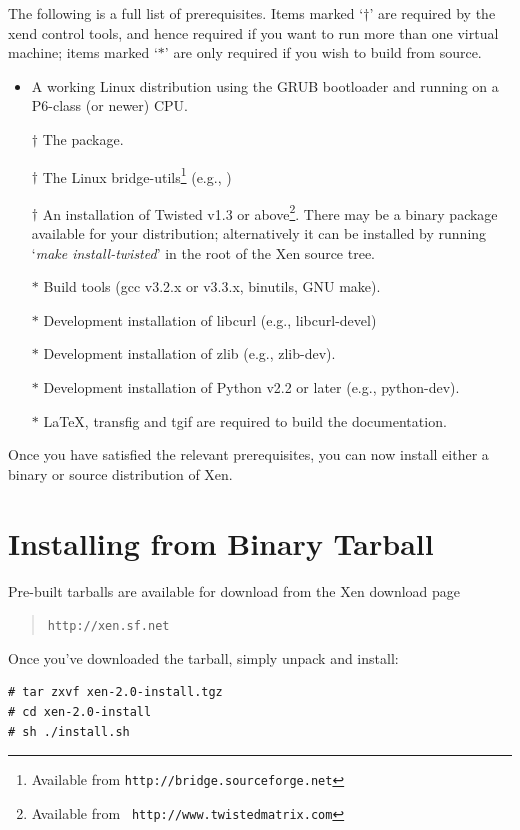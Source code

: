 \documentclass[11pt,twoside,final,openright]{report}
\def\xend{{xend}\xspace}
\begin{document}
The following is a full list of prerequisites.  Items marked `$\dag$'
are required by the \xend control tools, and hence required if you
want to run more than one virtual machine; items marked `$*$' are only
required if you wish to build from source.
\begin{itemize}
\item A working Linux distribution using the GRUB bootloader and
running on a P6-class (or newer) CPU.
\item [$\dag$] The  package. 
\item [$\dag$] The Linux bridge-utils\footnote{Available from 
{\tt http://bridge.sourceforge.net}} (e.g., )
\item [$\dag$] An installation of Twisted v1.3 or
above\footnote{Available from {\tt
http://www.twistedmatrix.com}}. There may be a binary package
available for your distribution; alternatively it can be installed by
running `{\sl make install-twisted}' in the root of the Xen source
tree.
\item [$*$] Build tools (gcc v3.2.x or v3.3.x, binutils, GNU make).
\item [$*$] Development installation of libcurl (e.g., libcurl-devel) 
\item [$*$] Development installation of zlib (e.g., zlib-dev).
\item [$*$] Development installation of Python v2.2 or later (e.g., python-dev).
\item [$*$] \LaTeX, transfig and tgif are required to build the documentation.
\end{itemize}

Once you have satisfied the relevant prerequisites, you can 
now install either a binary or source distribution of Xen. 

\section{Installing from Binary Tarball} 

Pre-built tarballs are available for download from the Xen 
download page
\begin{quote} 
{\tt http://xen.sf.net}
\end{quote} 

Once you've downloaded the tarball, simply unpack and install: 
\begin{verbatim}
# tar zxvf xen-2.0-install.tgz
# cd xen-2.0-install
# sh ./install.sh 
\end{verbatim} 
\end{document}
